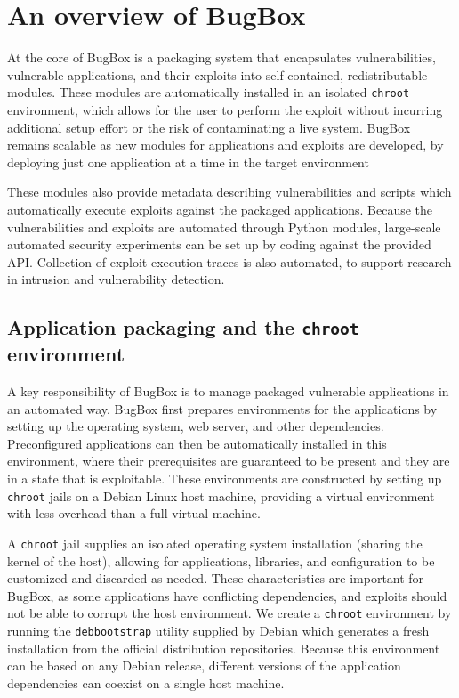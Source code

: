 \documentclass[letterpaper,twocolumn,10pt]{article}
\begin{document}
\section{An overview of BugBox}

At the core of BugBox is a packaging system that encapsulates vulnerabilities, vulnerable applications, and their exploits into self-contained, redistributable modules. These modules are automatically installed in an isolated \texttt{chroot} environment, which allows for the user to perform the exploit without incurring additional setup effort or the risk of contaminating a live system. BugBox remains scalable as new modules for applications and exploits are developed, by deploying just one application at a time in the target environment

These modules also provide metadata describing vulnerabilities and scripts which automatically execute exploits against the packaged applications. Because the vulnerabilities and exploits are automated through Python modules, large-scale automated security experiments can be set up by coding against the provided API. Collection of exploit execution traces is also automated, to support research in intrusion and vulnerability detection.

\subsection{Application packaging and the {\tt chroot} environment}

A key responsibility of BugBox is to manage packaged vulnerable applications in an automated way. BugBox first prepares environments for the applications by setting up the operating system, web server, and other dependencies. Preconfigured applications can then be automatically installed in this environment, where their prerequisites are guaranteed to be present and they are in a state that is exploitable. These environments are constructed by setting up {\tt chroot} jails on a Debian Linux host machine, providing a virtual environment with less overhead than a full virtual machine.

A \texttt{chroot} jail supplies an isolated operating system installation (sharing the kernel of the host), allowing for applications, libraries, and configuration to be customized and discarded as needed. These characteristics are important for BugBox, as some applications have conflicting dependencies, and exploits should not be able to corrupt the host environment. We create a \texttt{chroot} environment by running the \texttt{debbootstrap} utility supplied by Debian which generates a fresh installation from the official distribution repositories. Because this environment can be based on any Debian release, different versions of the application dependencies can coexist on a single host machine. 
\end{document}
